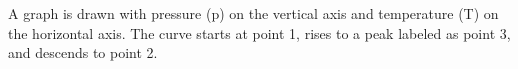 A graph is drawn with pressure (p) on the vertical axis and temperature (T) on the horizontal axis. The curve starts at point 1, rises to a peak labeled as point 3, and descends to point 2.